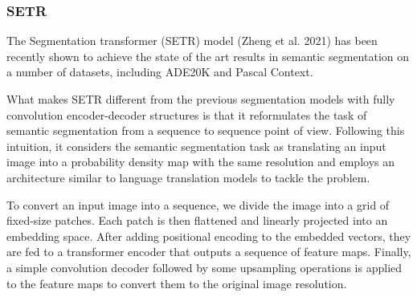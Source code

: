 \documentclass[letterpaper]{article} %
\begin{document}

 

 
 
\subsubsection{SETR}
The Segmentation transformer (SETR) model (Zheng et al. 2021) has been recently shown to achieve the state of the art results in semantic segmentation on a number of datasets, including ADE20K and Pascal Context.

What makes SETR different from the previous segmentation models with fully convolution encoder-decoder structures is that it reformulates the task of semantic segmentation from a sequence to sequence point of view. Following this intuition, it considers the semantic segmentation task as translating an input image into a probability density map with the same resolution and employs an architecture similar to language translation models to tackle the problem.

To convert an input image into a sequence, we divide the image into a grid of fixed-size patches. Each patch is then flattened and linearly projected into an embedding space.  After adding positional encoding to the embedded vectors, they are fed to a transformer encoder that outputs a sequence of feature maps. Finally, a simple convolution decoder followed by some upsampling operations is applied to the feature maps to convert them to the original image resolution.
\end{document}
